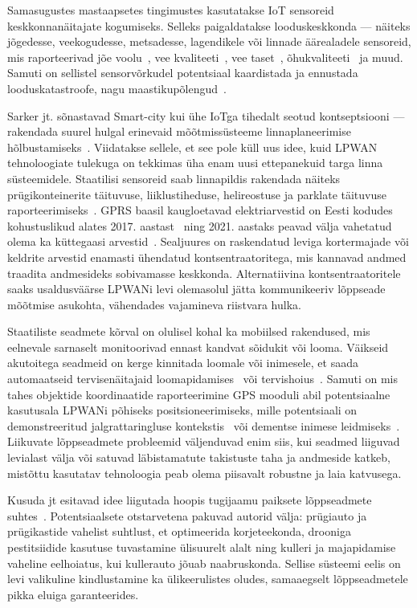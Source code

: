 \documentclass[12pt]{article}
\begin{document}
    Samasugustes mastaapsetes tingimustes kasutatakse IoT sensoreid keskkonnanäitajate kogumiseks.
    Selleks paigaldatakse looduskeskkonda — näiteks jõgedesse, veekogudesse, metsadesse, lagendikele või linnade äärealadele sensoreid, mis raporteerivad jõe voolu~\cite{guibene2017evaluation}, vee kvaliteeti~\cite{liu2018solar}, vee taset~\cite{moreno2019rivercore}, õhukvaliteeti~\cite{knoll2018low} ja muud.
    Samuti on sellistel sensorvõrkudel potentsiaal kaardistada ja ennustada looduskatastroofe, nagu maastikupõlengud~\cite{kang}.

    Sarker jt. sõnastavad Smart-city kui ühe IoTga tihedalt seotud kontseptsiooni — rakendada suurel hulgal erinevaid mõõtmissüsteeme linnaplaneerimise hõlbustamiseks~\cite{sarker2019survey}.
    Viidatakse sellele, et see pole küll uus idee, kuid LPWAN tehnoloogiate tulekuga on tekkimas üha enam uusi ettepanekuid targa linna süsteemidele.
    Staatilisi sensoreid saab linnapildis rakendada näiteks prügikonteinerite täituvuse, liiklustiheduse, helireostuse ja parklate täituvuse raporteerimiseks~\cite{zanella}.
    GPRS baasil kaugloetavad elektriarvestid on Eesti kodudes kohustuslikud alates 2017. aastast~\cite{laurit} ning 2021. aastaks peavad välja vahetatud olema ka küttegaasi arvestid~\cite{gaas}.
    Sealjuures on raskendatud leviga kortermajade või keldrite arvestid enamasti ühendatud kontsentraatoritega, mis kannavad andmed traadita andmesideks sobivamasse keskkonda.
    Alternatiivina kontsentraatoritele saaks usaldusväärse LPWANi levi olemasolul jätta kommunikeeriv lõppseade mõõtmise asukohta, vähendades vajamineva riistvara hulka.

    Staatiliste seadmete kõrval on olulisel kohal ka mobiilsed rakendused, mis eelnevale sarnaselt monitoorivad ennast kandvat sõidukit või looma.
    Väikseid akutoitega seadmeid on kerge kinnitada loomale või inimesele, et saada automaatseid tervisenäitajaid loomapidamises~\cite{germani, liliu} või tervishoius~\cite{olatinwo, petajajarvi}.
    Samuti on mis tahes objektide koordinaatide raporteerimine GPS mooduli abil potentsiaalne kasutusala LPWANi põhiseks positsioneerimiseks, mille potentsiaali on demonstreeritud jalgrattaringluse kontekstis~\cite{kimpark} või dementse inimese leidmiseks~\cite{hadwen}.
    Liikuvate lõppseadmete probleemid väljenduvad enim siis, kui seadmed liiguvad levialast välja või satuvad läbistamatute takistuste taha ja andmeside katkeb, mistõttu kasutatav tehnoloogia peab olema piisavalt robustne ja laia katvusega.

    Kusuda jt esitavad idee liigutada hoopis tugijaamu paiksete lõppseadmete suhtes~\cite{kusuda}.
    Potentsiaalsete otstarvetena pakuvad autorid välja: prügiauto ja prügikastide vahelist suhtlust, et optimeerida korjeteekonda, drooniga pestitsiidide kasutuse tuvastamine ülisuurelt alalt ning kulleri ja majapidamise vaheline eelhoiatus, kui kullerauto jõuab naabruskonda.
    Sellise süsteemi eelis on levi valikuline kindlustamine ka ülikeerulistes oludes, samaaegselt lõppseadmetele pikka eluiga garanteerides.
\end{document}
